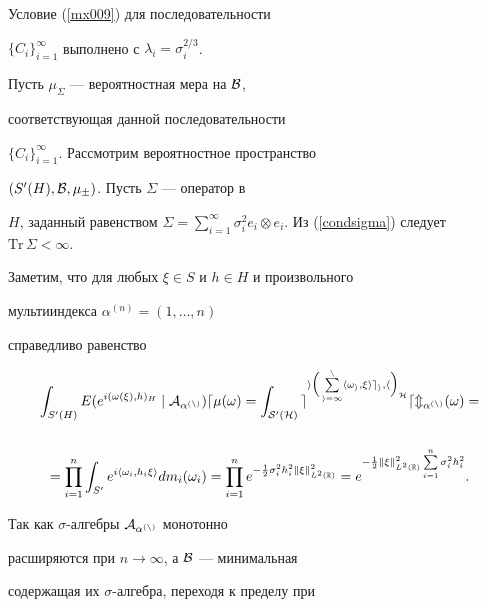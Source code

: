\begin{exam}
Условие (\ref{mx009}) для последовательности


$\{C_i\}_{i=1}^{\infty}$ выполнено с $\lambda_i=\sigma_i^{2/3}$.





Пусть $\mu_\Sigma$ --- вероятностная мера на $\cal{B}$,


соответствующая данной последовательности


$\{C_i\}_{i=1}^{\infty}$. Рассмотрим вероятностное пространство


$(S'(H),\cal{B},\mu_\Sigma)$. Пусть $\Sigma$ --- оператор в


$H$, заданный равенством $\Sigma=\sum\limits_{i=1}^{\infty}\sigma_i^2


e_i\otimes e_i$. Из (\ref{condsigma}) следует $\mathrm{Tr}\,


\Sigma<\infty$.





Заметим, что для любых $\xi\in S$ и $h\in H$ и произвольного


мультииндекса $\alpha^{(n)}=(1,\dotsc, n)$


справедливо равенство


\begin{multline*}


\int_{S'(H)}


E (e^{i(\omega(\xi),h)_H} \mid\cal{A}_{\alpha^{(n)}})


d\mu(\omega)=\int_{S'(H)}


e^{i \Big(\sum\limits_{i=1}^n\la\omega_i,\xi\ra e_i,h\Big)_H}


dm_{\alpha^{(n)}}(\omega)= \\


\\


= \prod_{i=1}^n \int_{S'}


e^{i\la \omega_i,h_i\xi\ra } dm_i(\omega_i)=\prod_{i=1}^n


e^{-\frac{1}{2}\sigma_i^2h_i^2\|\xi\|^2_{L^2(\Bbb{R})}}=


e^{-\frac{1}{2}\|\xi\|^2_{L^2(\Bbb{R})}\sum\limits_{i=1}^n\sigma_i^2h_i^2}.


\end{multline*}


Так как $\sigma$-алгебры $\cal{A}_{\alpha^{(n)}}$ монотонно


расширяются при $n\to\infty$, а $\cal{B}$ --- минимальная


содержащая их $\sigma$-алгебра, переходя к пределу при



\end{exam}
